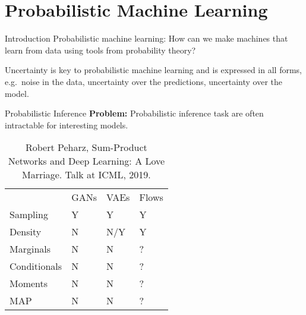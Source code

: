 \section{Probabilistic Machine Learning}

\begin{frame}{Introduction}
Probabilistic machine learning: How can we make machines that learn from data using tools from probability theory?

Uncertainty is key to probabilistic machine learning and is expressed in all forms, e.g.~noise in the data, uncertainty over the predictions, uncertainty over the model.
\end{frame}



\begin{frame}{Probabilistic Inference}
\textbf{Problem:} Probabilistic inference task are often intractable for interesting models.

\begin{table}
\centering
\begin{tabular}{llll}
             & GANs & VAEs & Flows  \\
Sampling     & Y    & Y    & Y          \\
Density      & N    & N/Y  & Y           \\
Marginals    & N    & N    & ?           \\
Conditionals & N    & N    & ?           \\
Moments      & N    & N    & ?           \\
MAP          & N    & N    & ?
\end{tabular}
\caption{\scriptsize Robert Peharz, Sum-Product Networks and Deep Learning: A Love Marriage. Talk at ICML, 2019.}
\end{table}
\end{frame}
